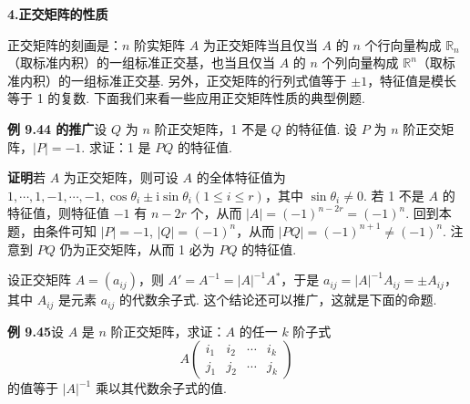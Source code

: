 \documentclass[UTF8, 12pt, fontset=fandol, oneside]{ctexart}
\begin{document}
\noindent\textbf{4.\quad 正交矩阵的性质}

正交矩阵的刻画是：$n$ 阶实矩阵 $A$ 为正交矩阵当且仅当 $A$ 的 $n$ 个行向量构成 $\mathbb{R}_n$（取标准内积）的一组标准正交基，也当且仅当 $A$ 的 $n$ 个列向量构成 $\mathbb{R}^n$（取标准内积）的一组标准正交基. 另外，正交矩阵的行列式值等于 $\pm1$，特征值是模长等于 1 的复数. 下面我们来看一些应用正交矩阵性质的典型例题.

\noindent\textbf{例 9.44 的推广}\quad 设 $Q$ 为 $n$ 阶正交矩阵，1 不是 $Q$ 的特征值. 设 $P$ 为 $n$ 阶正交矩阵，$|P|=-1$. 求证：1 是 $PQ$ 的特征值.

\noindent\textbf{证明}\quad 若 $A$ 为正交矩阵，则可设 $A$ 的全体特征值为 $1,\cdots,1,-1,\cdots,-1,\cos\theta_i\pm\mathrm{i}\sin\theta_i(1\le i\le r)$，其中 $\sin\theta_i\ne0$. 若 1 不是 $A$ 的特征值，则特征值 $-1$ 有 $n-2r$ 个，从而 $|A|=(-1)^{n-2r}=(-1)^n$. 回到本题，由条件可知 $|P|=-1$, $|Q|=(-1)^n$，从而 $|PQ|=(-1)^{n+1}\ne(-1)^n$. 注意到 $PQ$ 仍为正交矩阵，从而 1 必为 $PQ$ 的特征值.

设正交矩阵 $A=(a_{ij})$，则 $A'=A^{-1}=|A|^{-1}A^*$，于是 $a_{ij}=|A|^{-1}A_{ij}=\pm A_{ij}$，其中 $A_{ij}$ 是元素 $a_{ij}$ 的代数余子式. 这个结论还可以推广，这就是下面的命题.

\noindent\textbf{例 9.45}\quad 设 $A$ 是 $n$ 阶正交矩阵，求证：$A$ 的任一 $k$ 阶子式
\[
A\begin{pmatrix}
i_1&i_2&\cdots&i_k\\
j_1&j_2&\cdots&j_k
\end{pmatrix}
\]
的值等于 $|A|^{-1}$ 乘以其代数余子式的值.
\end{document}
